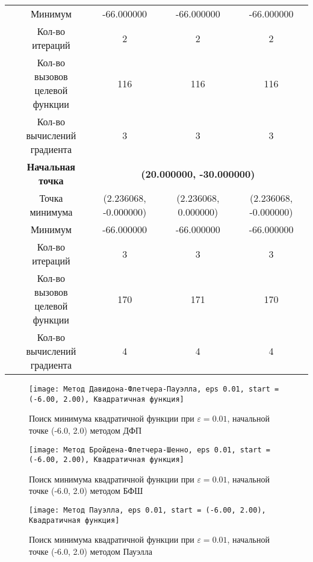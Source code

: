 \begin{table}[H]
\begin{tabular}{|c|c|c|c|c|}
	\cline{2-5}
	&Минимум &-66.000000 &-66.000000 &-66.000000 \\ 
	\cline{2-5}
	&Кол-во итераций &2 &2 &2 \\ 
	\cline{2-5}
	&\makecell{Кол-во вызовов\\целевой функции} &116 &116 &116 \\ 
	\cline{2-5}
	&\makecell{Кол-во вычислений\\градиента} &3 &3 &3 \\ 
	\cline{2-5}
\cline{2-5}&\textbf{Начальная точка} &\multicolumn{3}{c|}{\textbf{(20.000000, -30.000000)}}\\
	\cline{2-5}
	&Точка минимума &(2.236068, -0.000000) &(2.236068, 0.000000) &(2.236068, -0.000000) \\ 
	\cline{2-5}
	&Минимум &-66.000000 &-66.000000 &-66.000000 \\ 
	\cline{2-5}
	&Кол-во итераций &3 &3 &3 \\ 
	\cline{2-5}
	&\makecell{Кол-во вызовов\\целевой функции} &170 &171 &170 \\ 
	\cline{2-5}
	&\makecell{Кол-во вычислений\\градиента} &4 &4 &4 \\ 
	\cline{2-5}
	\hline

\end{tabular}
\end{table}


            \begin{figure}[H]
	        \centering
	        \texttt{[image: Метод Давидона-Флетчера-Пауэлла, eps 0.01, start = (-6.00, 2.00), Квадратичная функция]}%
	        \caption{Поиск минимума квадратичной функции при $\varepsilon = 0.01$, начальной точке (-6.0, 2.0) методом ДФП}
	        \vspace*{-1.2cm}
            \end{figure}
            
            \begin{figure}[H]
	        \centering
	        \texttt{[image: Метод Бройдена-Флетчера-Шенно, eps 0.01, start = (-6.00, 2.00), Квадратичная функция]}%
	        \caption{Поиск минимума квадратичной функции при $\varepsilon = 0.01$, начальной точке (-6.0, 2.0) методом БФШ}
	        \vspace*{-1.2cm}
            \end{figure}
            
            \begin{figure}[H]
	        \centering
	        \texttt{[image: Метод Пауэлла, eps 0.01, start = (-6.00, 2.00), Квадратичная функция]}%
	        \caption{Поиск минимума квадратичной функции при $\varepsilon = 0.01$, начальной точке (-6.0, 2.0) методом Пауэлла}
	        \vspace*{-1.2cm}
            \end{figure}
            
